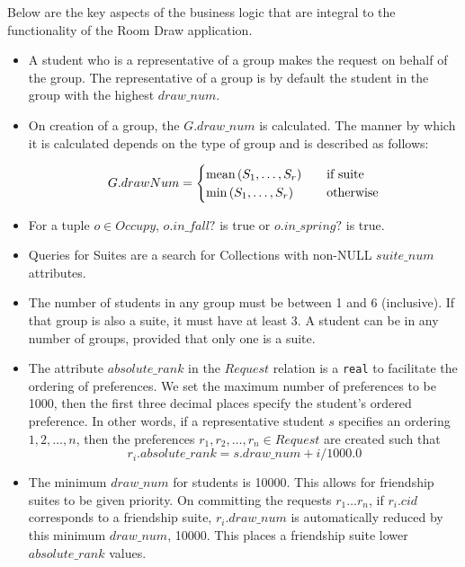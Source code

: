 \noindent Below are the key aspects of the business logic that are integral to
the functionality of the Room Draw application.

\begin{itemize}
\item A student who is a representative of a group makes the request on behalf
of the group. The representative of a group is by default the student in the
group with the highest \(draw\_num\).

\item On creation of a group, the \(G.draw\_num\) is calculated. The manner by
which it is calculated depends on the type of group and is described as follows:

\[
    G.drawNum =
        \begin{cases}
        \text{mean} \del{S_1, \ldots, S_r} & \quad \mbox{if suite} \\
        \min \del{S_1, \ldots, S_r} & \quad \mbox{otherwise}
        \end{cases}
\]

\item For a tuple \(o \in Occupy\), \(o.in\_fall?\) is true or \(o.in\_spring?\) is true.

\item Queries for Suites are a search for Collections with non-NULL \(suite\_num\)
attributes.

\item The number of students in any group must be between 1 and 6 (inclusive).
If that group is also a suite, it must have at least 3. A student can be in any
number of groups, provided that only one is a suite.

\item The attribute \(absolute\_rank\) in the \(Request\) relation is a \texttt{real} to
facilitate the ordering of preferences.  We set the maximum number of preferences to
be 1000, then the first three decimal places specify the student's ordered
preference. In other words, if a representative student \(s\) specifies an
ordering \(1,2,\ldots, n\), then the preferences \(r_1,r_2, \ldots, r_n \in
Request\) are created such that \[r_i.absolute\_rank = s.draw\_num + i/1000.0\]

\item The minimum \(draw\_num\) for students is \num{10000}. This allows for
friendship suites to be given priority. On committing the requests \(r_1\ldots
r_n\), if \(r_i.cid\) corresponds to a friendship suite, \(r_i.draw\_num\) is
automatically reduced by this minimum \(draw\_num\), \num{10000}. This places a friendship suite lower \(absolute\_rank\) values.
\end{itemize}

